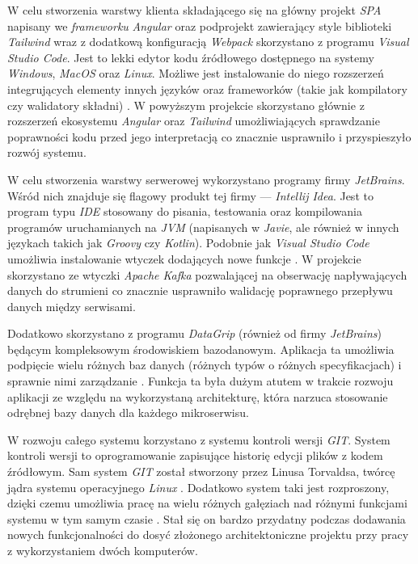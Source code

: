 

W celu stworzenia warstwy klienta składającego się na główny projekt \textit{SPA} napisany we \textit{frameworku}
\textit{Angular} oraz podprojekt zawierający style biblioteki \textit{Tailwind} wraz z dodatkową konfiguracją
\textit{Webpack} skorzystano z programu \textit{Visual Studio Code}. Jest to lekki edytor kodu źródłowego dostępnego na
systemy \textit{Windows}, \textit{MacOS} oraz \textit{Linux}. Możliwe jest instalowanie do niego rozszerzeń
integrujących elementy innych języków oraz frameworków (takie jak kompilatory czy walidatory składni) \cite{bib:vscode}.
W powyższym projekcie skorzystano głównie z rozszerzeń ekosystemu \textit{Angular} oraz \textit{Tailwind}
umożliwiających sprawdzanie poprawności kodu przed jego interpretacją co znacznie usprawniło i przyspieszyło rozwój
systemu.


W celu stworzenia warstwy serwerowej wykorzystano programy firmy \textit{JetBrains}. Wśród nich znajduje się flagowy
produkt tej firmy — \textit{Intellij Idea}. Jest to program typu \textit{IDE} stosowany do pisania, testowania oraz
kompilowania programów uruchamianych na \textit{JVM} (napisanych w \textit{Javie}, ale również w innych językach takich
jak \textit{Groovy} czy \textit{Kotlin}). Podobnie jak \textit{Visual Studio Code} umożliwia instalowanie wtyczek
dodających nowe funkcje \cite{bib:intellij-idea}. W projekcie skorzystano ze wtyczki \textit{Apache Kafka} pozwalającej
na obserwację napływających danych do strumieni co znacznie usprawniło walidację poprawnego przepływu danych między
serwisami.

Dodatkowo skorzystano z programu \textit{DataGrip} (również od firmy \textit{JetBrains}) będącym kompleksowym
środowiskiem bazodanowym. Aplikacja ta umożliwia podpięcie wielu różnych baz danych (różnych typów o różnych
specyfikacjach) i sprawnie nimi zarządzanie \cite{bib:intellij-datagrip}. Funkcja ta była dużym atutem w trakcie rozwoju
aplikacji ze względu na wykorzystaną architekturę, która narzuca stosowanie odrębnej bazy danych dla każdego
mikroserwisu.


W rozwoju całego systemu korzystano z systemu kontroli wersji \textit{GIT}. System kontroli wersji to oprogramowanie
zapisujące historię edycji plików z kodem źródłowym. Sam system \textit{GIT} został stworzony przez Linusa Torvaldsa,
twórcę jądra systemu operacyjnego \textit{Linux} \cite{bib:git-history}. Dodatkowo system taki jest rozproszony, dzięki
czemu umożliwia pracę na wielu różnych gałęziach nad różnymi funkcjami systemu w tym samym czasie
\cite{bib:git-overview}. Stał się on bardzo przydatny podczas dodawania nowych funkcjonalności do dosyć złożonego
architektoniczne projektu przy pracy z wykorzystaniem dwóch komputerów.

